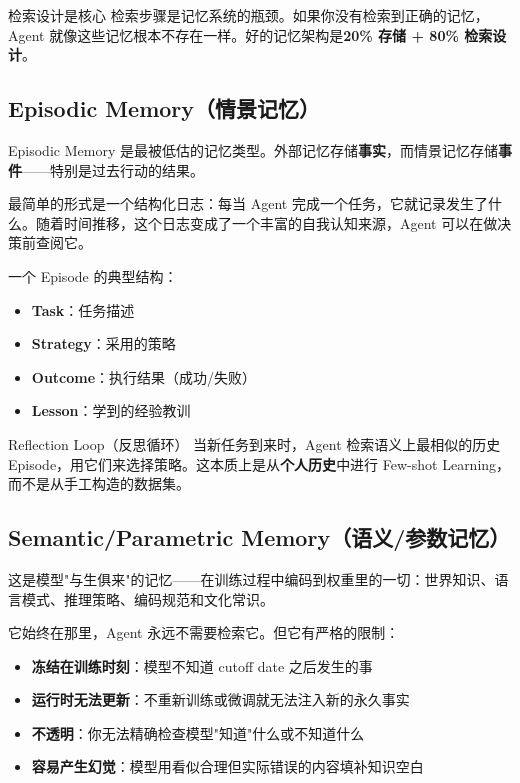 \documentclass[a4paper]{article}
\begin{document}
\begin{importantbox}{检索设计是核心}
检索步骤是记忆系统的瓶颈。如果你没有检索到正确的记忆，Agent 就像这些记忆根本不存在一样。好的记忆架构是\textbf{20\% 存储 + 80\% 检索设计}。
\end{importantbox}

\subsection{Episodic Memory（情景记忆）}

Episodic Memory 是最被低估的记忆类型。外部记忆存储\textbf{事实}，而情景记忆存储\textbf{事件}——特别是过去行动的结果。

最简单的形式是一个结构化日志：每当 Agent 完成一个任务，它就记录发生了什么。随着时间推移，这个日志变成了一个丰富的自我认知来源，Agent 可以在做决策前查阅它。

一个 Episode 的典型结构：

\begin{itemize}[leftmargin=2em]
    \item \textbf{Task}：任务描述
    \item \textbf{Strategy}：采用的策略
    \item \textbf{Outcome}：执行结果（成功/失败）
    \item \textbf{Lesson}：学到的经验教训
\end{itemize}

\begin{knowledgebox}{Reflection Loop（反思循环）}
当新任务到来时，Agent 检索语义上最相似的历史 Episode，用它们来选择策略。这本质上是从\textbf{个人历史}中进行 Few-shot Learning，而不是从手工构造的数据集。
\end{knowledgebox}

\subsection{Semantic/Parametric Memory（语义/参数记忆）}

这是模型"与生俱来"的记忆——在训练过程中编码到权重里的一切：世界知识、语言模式、推理策略、编码规范和文化常识。

它始终在那里，Agent 永远不需要检索它。但它有严格的限制：

\begin{itemize}[leftmargin=2em]
    \item \textbf{冻结在训练时刻}：模型不知道 cutoff date 之后发生的事
    \item \textbf{运行时无法更新}：不重新训练或微调就无法注入新的永久事实
    \item \textbf{不透明}：你无法精确检查模型"知道"什么或不知道什么
    \item \textbf{容易产生幻觉}：模型用看似合理但实际错误的内容填补知识空白
\end{itemize}
\end{document}
